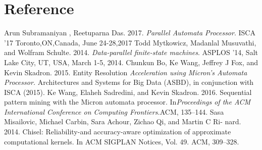 \section{Reference}
\begin{thebibliography}{9}
    Arun Subramaniyan , Reetuparna Das. 2017.
    \textit{Parallel Automata Processor}. 
    ISCA ’17 Toronto,ON,Canada, June 24-28,2017
    Todd Mytkowicz, Madanlal Musuvathi, and Wolfram Schulte. 2014.
    \textit{Data-parallel
    finite-state machines}. 
    ASPLOS ’14, Salt Lake City, UT, USA, March 1-5, 2014.
    Chunkun Bo, Ke Wang, Jeffrey J Fox, and Kevin Skadron. 2015. Entity Resolution
    \textit{Acceleration using Micron’s Automata Processor.}
    Architectures and Systems for
    Big Data (ASBD), in conjunction with ISCA (2015).
    Ke Wang, Elaheh Sadredini, and Kevin Skadron. 2016. Sequential pattern mining
with the Micron automata processor. In\textit{Proceedings of the ACM International
Conference on Computing Frontiers.}ACM, 135–144.
Sasa Misailovic, Michael Carbin, Sara Achour, Zichao Qi, and Martin C Ri-
nard. 2014. Chisel: Reliability-and accuracy-aware optimization of approximate
computational kernels. In ACM SIGPLAN Notices, Vol. 49. ACM, 309–328.
    
\end{thebibliography}
